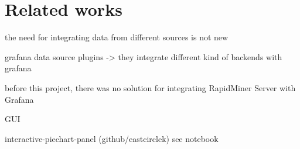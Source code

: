 \chapter{Related works}

the need for integrating data from different sources is not new

grafana data source plugins -> they integrate different kind of backends with grafana

before this project, there was no solution for integrating RapidMiner Server with Grafana

GUI

interactive-piechart-panel (github/eastcirclek)
see notebook


